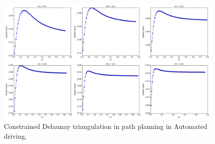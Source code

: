 \begin{figure}[ht]
\centering
\includegraphics[width=\textwidth]{Figures/k1k2.png}
\caption[Constrained Delaunay triangulation in path planning in Automated driving]{Constrained Delaunay triangulation in path planning in Automated driving.} 
\label{fig:k1k2}
\end{figure}




